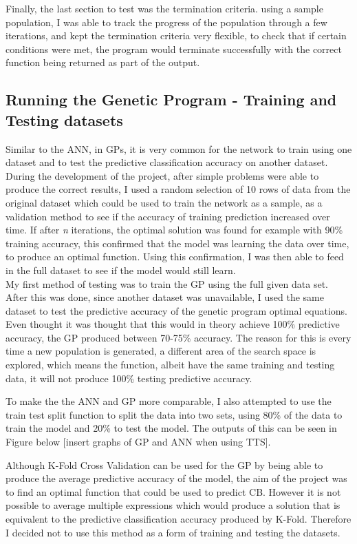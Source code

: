 \documentclass[11pt]{article}
\begin{document}
Finally, the last section to test was the termination criteria. using a sample population, I was able to track the progress of the population through a few iterations, and kept the termination criteria very flexible, to check that if certain conditions were met, the program would terminate successfully with the correct function being returned as part of the output. 

\subsection{Running the Genetic Program - Training and Testing datasets}
Similar to the ANN, in GPs, it is very common for the network to train using one dataset and to test the predictive classification accuracy on another dataset. During the development of the project, after simple problems were able to produce the correct results, I used a random selection of 10 rows of data from the original dataset which could be used to train the network as a sample, as a validation method to see if the accuracy of training prediction increased over time. If after \textit{n} iterations, the optimal solution was found for example with 90\% training accuracy, this confirmed that the model was learning the data over time, to produce an optimal function. Using this confirmation, I was then able to feed in the full dataset to see if the model would still learn. \\
My first method of testing was to train the GP using the full given data set. After this was done, since another dataset was unavailable, I used the same dataset to test the predictive accuracy of the genetic program optimal equations. Even thought it was thought that this would in theory achieve 100\% predictive accuracy, the GP produced between 70-75\% accuracy. The reason for this is every time a new population is generated, a different area of the search space is explored, which means the function, albeit have the same training and testing data, it will not produce 100\% testing predictive accuracy. 

To make the the ANN and GP more comparable, I also attempted to use the train test split function to split the data into two sets, using 80\% of the data to train the model and 20\% to test the model. The outputs of this can be seen in Figure below [insert graphs of GP and ANN when using TTS]. 

Although K-Fold Cross Validation can be used for the GP by being able to produce the average predictive accuracy of the model, the aim of the project was to find an optimal function that could be used to predict CB. However it is not possible to average multiple expressions which would produce a solution that is equivalent to the predictive classification accuracy produced by K-Fold. Therefore I decided not to use this method as a form of training and testing the datasets. 
\end{document}
